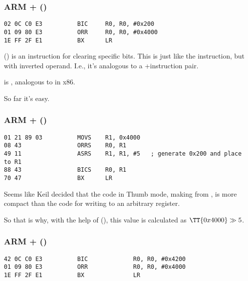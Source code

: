 \subsubsection{ARM + \OptimizingKeilVI (\ARMMode)}

\begin{lstlisting}[caption=\OptimizingKeilVI (\ARMMode),style=customasmARM]
02 0C C0 E3          BIC     R0, R0, #0x200
01 09 80 E3          ORR     R0, R0, #0x4000
1E FF 2F E1          BX      LR
\end{lstlisting}

 () is an instruction for clearing 
specific bits. This is just like the \AND instruction, but with inverted operand.
I.e., it's analogous to a \NOT+\AND instruction pair.

 is , analogous to \OR in x86.

So far it's easy.

\subsubsection{ARM + \OptimizingKeilVI (\ThumbMode)}

\begin{lstlisting}[caption=\OptimizingKeilVI (\ThumbMode),style=customasmARM]
01 21 89 03          MOVS    R1, 0x4000
08 43                ORRS    R0, R1
49 11                ASRS    R1, R1, #5   ; generate 0x200 and place to R1
88 43                BICS    R0, R1
70 47                BX      LR
\end{lstlisting}

Seems like Keil decided that the code in Thumb mode,
making  from , 
is more compact than the code 
for writing  to an arbitrary register.


So that is why, with the help of  (\ASRdesc), this value is calculated as $\TT{0x4000} \gg 5$.

\subsubsection{ARM + \OptimizingXcodeIV (\ARMMode)}
\label{anomaly:LLVM}
\myindex{\CompilerAnomaly}

\begin{lstlisting}[caption=\OptimizingXcodeIV (\ARMMode),label=ARM_leaf_example3,style=customasmARM]
42 0C C0 E3          BIC             R0, R0, #0x4200
01 09 80 E3          ORR             R0, R0, #0x4000
1E FF 2F E1          BX              LR
\end{lstlisting}

